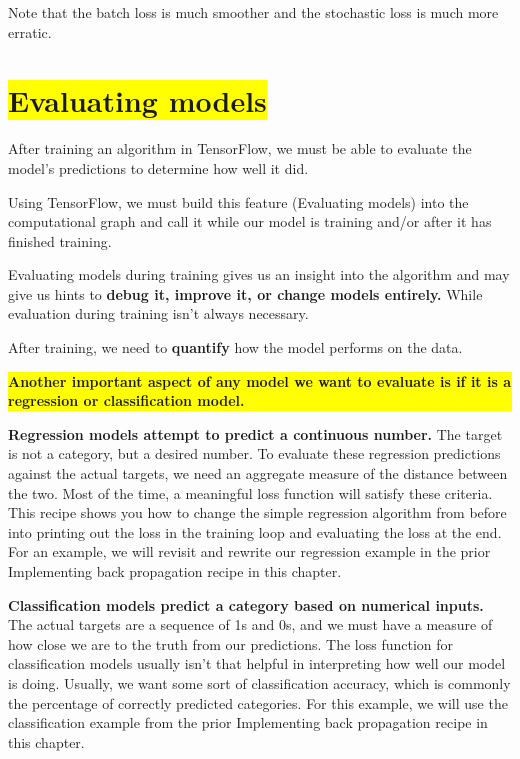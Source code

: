 \documentclass{article}
\begin{document}
Note that the batch loss is much smoother and the stochastic loss is much more erratic.

\section{\colorbox{yellow}{Evaluating models}}
After training an algorithm in TensorFlow, we must be able to evaluate the model's predictions to determine how well it did.

Using TensorFlow, we must build this feature (Evaluating models) into the computational graph and call it while our model is training and/or after it has finished training.

Evaluating models during training gives us an insight into the algorithm and may give us hints to \textbf{debug it, improve it, or change models entirely.} While evaluation during training isn't always necessary.

After training, we need to \textbf{quantify} how the model performs on the data.

\noindent\colorbox{yellow}
{\parbox{\dimexpr\textwidth-2\fboxsep\relax}{\textbf{Another important aspect of any model we want to evaluate is if it is a regression or classification model.}}}

\textbf{Regression models attempt to predict a continuous number.} The target is not a category, but a desired number. To evaluate these regression predictions against the actual targets, we need an aggregate measure of the distance between the two. Most of the time, a meaningful loss function will satisfy these criteria. This recipe shows you how to change the simple regression algorithm from before into printing out the loss in the training loop and evaluating the loss at the end. For an example, we will revisit and rewrite our regression example in the prior Implementing back propagation recipe in this chapter.

\textbf{Classification models predict a category based on numerical inputs.} The actual targets are a sequence of 1s and 0s, and we must have a measure of how close we are to the truth from our predictions. The loss function for classification models usually isn't that helpful in interpreting how well our model is doing. Usually, we want some sort of classification accuracy, which is commonly the percentage of correctly predicted categories. For this example, we will use the classification example from the prior Implementing back propagation recipe in this chapter.
\end{document}
